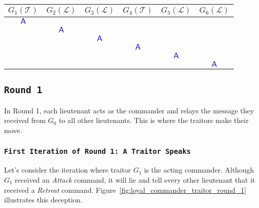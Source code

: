 \documentclass[11pt]{article}
\newcommand{\cmdA}{\ensuremath{\mathsf{A}}} %
\newcommand{\loyal}{\ensuremath{\mathcal{L}}}
\newcommand{\traitor}{\ensuremath{\mathcal{T}}}
\newcommand{\gen}[1]{\ensuremath{G_{#1}}}
\begin{document}
\begin{center}
\vspace{1em} %
\renewcommand{\arraystretch}{1.5}
\setlength{\tabcolsep}{6pt} %
\begin{tabular}{c|c|c|c|c|c}
    \hline
    \textbf{$\gen{1}(\traitor)$} & \textbf{$\gen{2}(\loyal)$} & \textbf{$\gen{3}(\loyal)$} & \textbf{$\gen{4}(\traitor)$} & \textbf{$\gen{5}(\loyal)$} & \textbf{$\gen{6}(\loyal)$} \\
    \hline
    \cellcolor{yellow!30}\textbf{\textcolor{blue}{\cmdA}} & & & & & \\
    \hline
     & \cellcolor{yellow!30}\textbf{\textcolor{blue}{\cmdA}} & & & & \\
    \hline
     & & \cellcolor{yellow!30}\textbf{\textcolor{blue}{\cmdA}} & & & \\
    \hline
     & & & \cellcolor{yellow!30}\textbf{\textcolor{blue}{\cmdA}} & & \\
    \hline
     & & & & \cellcolor{yellow!30}\textbf{\textcolor{blue}{\cmdA}} & \\
    \hline
     & & & & & \cellcolor{yellow!30}\textbf{\textcolor{blue}{\cmdA}} \\
    \hline
\end{tabular}
\label{tab:loyal_commander_round_2_values}
\end{center}

\subsection*{\texttt{\large Round 1}}
\justifying
In Round 1, each lieutenant acts as the commander and relays the message they received from $\gen{0}$ to all other lieutenants. This is where the traitors make their move.

\subsubsection*{\texttt{\large First Iteration of Round 1: A Traitor Speaks}}
\justifying
Let's consider the iteration where traitor $\gen{1}$ is the acting commander. Although $\gen{1}$ received an \textit{Attack} command, it will lie and tell every other lieutenant that it received a \textit{Retreat} command. Figure~\ref{fig:loyal_commander_traitor_round_1} illustrates this deception.
\end{document}
